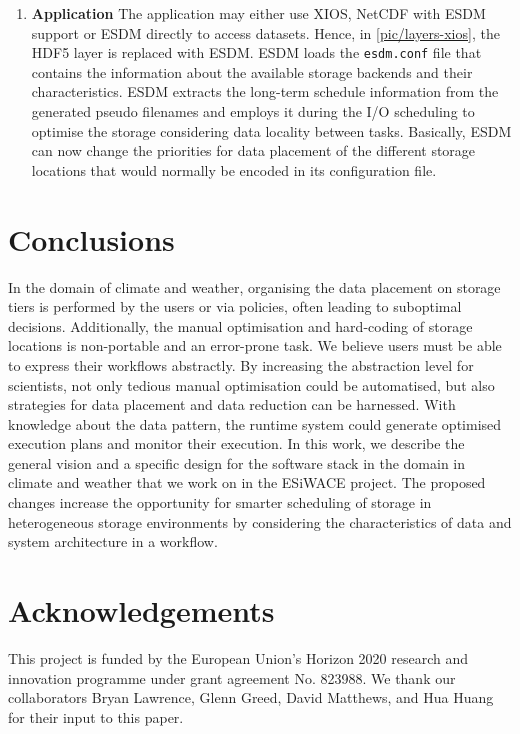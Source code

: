 \documentclass{superfri}
\begin{document}
\begin{enumerate}
  \item \textbf{Application}
  The application may either use XIOS, NetCDF with ESDM support or ESDM directly to access datasets.
  Hence, in \cref{pic/layers-xios}, the HDF5 layer is replaced with ESDM.
  ESDM loads the \texttt{esdm.conf} file that contains the information about the available storage backends and their characteristics.
  ESDM extracts the long-term schedule information from the generated pseudo filenames and employs it during the I/O scheduling to optimise the storage considering data locality between tasks.
  Basically, ESDM can now change the priorities for data placement of the different storage locations that would normally be encoded in its configuration file.
\end{enumerate}

\section{Conclusions}
\label{sec:conclusions}

In the domain of climate and weather, organising the data placement on storage tiers is performed by the users or via policies, often leading to suboptimal decisions.
Additionally, the manual optimisation and hard-coding of storage locations is non-portable and an error-prone task.
We believe users must be able to express their workflows abstractly.
By increasing the abstraction level for scientists, not only tedious manual optimisation could be automatised, but also strategies for data placement and data reduction can be harnessed.
With knowledge about the data pattern, the runtime system could generate optimised execution plans and monitor their execution.
In this work, we describe the general vision and a specific design for the software stack in the domain in climate and weather that we work on in the ESiWACE project.
The proposed changes increase the opportunity for smarter scheduling of storage in heterogeneous storage environments by considering the characteristics of data and system architecture in a workflow.

\section*{Acknowledgements}

\small
This project is funded by the European Union's Horizon 2020 research and innovation programme under grant agreement No. 823988.
We thank our collaborators Bryan Lawrence, Glenn Greed, David Matthews, and Hua Huang for their input to this paper.

\openaccess


\end{document}
